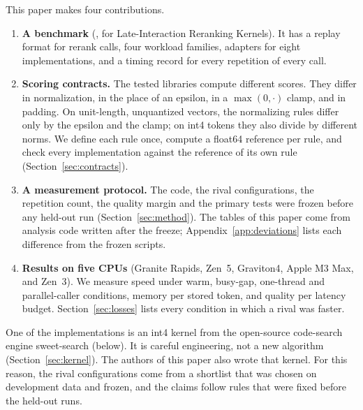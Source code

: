 This paper makes four contributions.
\begin{enumerate}
\item \textbf{A benchmark} (\benchname, for Late-Interaction Reranking Kernels). It has a replay format for rerank calls, four workload families, adapters for eight implementations, and a timing record for every repetition of every call.
\item \textbf{Scoring contracts.} The tested libraries compute different scores. They differ in normalization, in the place of an epsilon, in a $\max(0,\cdot)$ clamp, and in padding. On unit-length, unquantized vectors, the normalizing rules differ only by the epsilon and the clamp; on int4 tokens they also divide by different norms. We define each rule once, compute a float64 reference per rule, and check every implementation against the reference of its own rule (Section~\ref{sec:contracts}).
\item \textbf{A measurement protocol.} The code, the rival configurations, the repetition count, the quality margin and the primary tests were frozen before any held-out run (Section~\ref{sec:method}). The tables of this paper come from analysis code written after the freeze; Appendix~\ref{app:deviations} lists each difference from the frozen scripts.
\item \textbf{Results on five CPUs} (Granite Rapids, Zen~5, Graviton4, Apple M3 Max, and Zen~3). We measure speed under warm, busy-gap, one-thread and parallel-caller conditions, memory per stored token, and quality per latency budget. Section~\ref{sec:losses} lists every condition in which a rival was faster.
\end{enumerate}

One of the implementations is an int4 kernel from the open-source code-search engine sweet-search (\sweet below).
It is careful engineering, not a new algorithm (Section~\ref{sec:kernel}).
The authors of this paper also wrote that kernel.
For this reason, the rival configurations come from a shortlist that was chosen on development data and frozen, and the claims follow rules that were fixed before the held-out runs.

